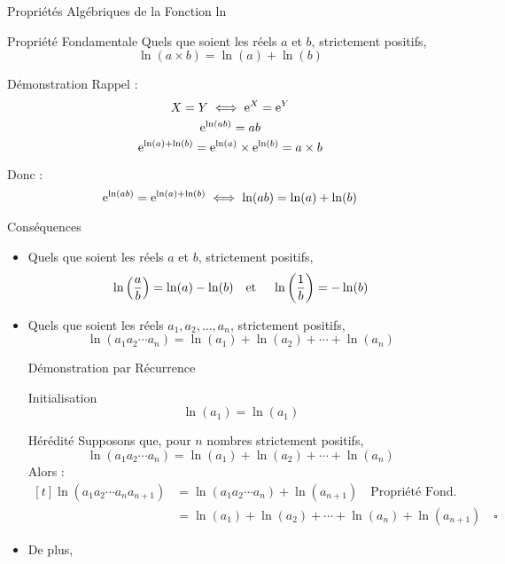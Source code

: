 \documentclass{cours}
\begin{document}
    \begin{Gpartie}{Propriétés Algébriques de la Fonction ln}
        \begin{Spartie}{Propriété Fondamentale}
            Quels que soient les réels $a$ et $b$, strictement positifs, 
            \[\ln(a\times b)=\ln(a)+\ln(b)\]
            \begin{SSpartie}{Démonstration}
                Rappel : \[X=Y\iff \mathrm{e}^X=\mathrm{e}^Y\]
                \[\mathrm{e}^{\ln(ab)}=ab\]
                \[\mathrm{e}^{\ln(a)+\ln(b)}=\mathrm{e}^{\ln(a)}\times \mathrm{e}^{\ln(b)}=a\times b\]

                Donc : \[\mathrm{e}^{\ln(ab)}=\mathrm{e}^{\ln(a)+\ln(b)}\iff\ln(ab)=\ln(a)+\ln(b)\]
            \end{SSpartie}
        \end{Spartie}
        \begin{Spartie}{Conséquences}
            \begin{itemize} 
                \item Quels que soient les réels $a$ et $b$, strictement positifs, 
                \[\ln\left(\frac{a}{b}\right)=\ln(a)-\ln(b)\text{\quad et \quad}\ln\left(\frac{1}{b}\right)=-\ln(b)\]
                \item Quels que soient les réels $a_1, a_2,\dotsc, a_n$, strictement positifs, 
                \[\ln(a_1a_2\dotsb a_n)=\ln(a_1)+\ln(a_2)+\dotsb+\ln(a_n)\]
                \begin{SSpartie}{Démonstration par Récurrence}
                    \begin{SSSpartie}{Initialisation}
                        \[\ln(a_1)=\ln(a_1)\]
                    \end{SSSpartie}
                    \begin{SSSpartie}{Hérédité}
                        Supposons que, pour $n$ nombres strictement positifs,
                        \[\ln(a_1a_2\dotsb a_n)=\ln(a_1)+\ln(a_2)+\dotsb+\ln(a_n)\]
                        Alors :
                        \[\begin{aligned}[t]
                            \ln(a_1a_2\dotsb a_na_{n+1})&=\ln(a_1a_2\dotsb a_n)+\ln(a_{n+1})\quad\text{Propriété Fond.} \\
                            &=\ln(a_1)+\ln(a_2)+\dotsb+\ln(a_n)+\ln(a_{n+1})\quad\square
                        \end{aligned}\]
                    \end{SSSpartie}
                \end{SSpartie}
                \item De plus, 

\end{itemize}
\end{Spartie}
\end{Gpartie}
\end{document}
